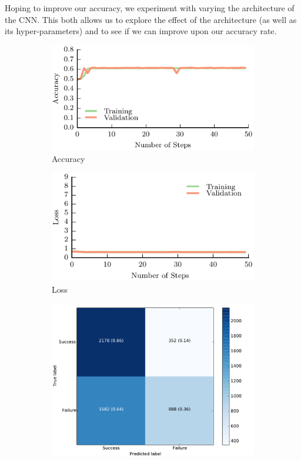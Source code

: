 Hoping to improve our accuracy, we experiment with varying the architecture of the CNN. 
This both allows us to explore the effect of the architecture (as well as its hyper-parameters) and to see if we can improve upon our accuracy rate. 

\begin{figure}[t!]
    \centering
    \begin{subfigure}[t]{0.32\textwidth}
        \includegraphics[width=0.9\columnwidth]{figs/gqcnn_accuracy.pdf}
        \caption{Accuracy} \label{fig:accuracy_gqcnn}
        \end{subfigure}
    \begin{subfigure}[t]{0.32\textwidth}
        \includegraphics[width=0.9\columnwidth]{figs/gqcnn_loss.pdf}
        \caption{Loss} \label{fig:loss_qgcnn}
    \end{subfigure}
		\begin{subfigure}[t]{0.32\textwidth}
        \includegraphics[width=0.8\columnwidth]{figs/trained_gqcnn.pdf}

\end{subfigure}
\end{figure}
